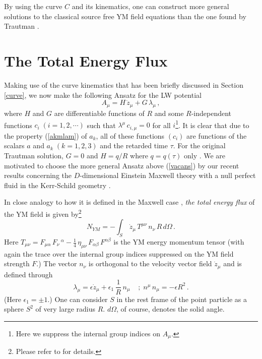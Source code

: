 \documentclass[a4paper,twocolumn,prd,showpacs,amsmath,amssymb]{revtex4}
\begin{document}
By using the curve $C$ and its kinematics, one can construct more general
solutions to the classical source free YM field equations than the one
found by Trautman \cite{traut}.

\section{\label{enflux} The Total Energy Flux}

Making use of the curve kinematics that has been briefly discussed in
Section \ref{curve}, we now make the following Ansatz for the LW potential
\begin{equation}
A_{\mu} = H \, \dot{z}_{\mu} + G \, \lambda_{\mu} \, , \label{vacans}
\end{equation}
where $H$ and $G$ are differentiable functions of $R$ and some $R$-independent
functions $c_i \; (i=1,2, \cdots)$ such that $\lambda^{\mu} \, c_{i,\mu} = 0$
for all $i$\footnote{Here we suppress the internal group indices on $A_{\mu}$.}. It
is clear that due to the property (\ref{akmlam}) of $a_k$, all of these
functions $(c_i)$ are functions of the scalars $a$ and $a_k \; (k=1,2,3)$
and the retarded time $\tau$. For the original Trautman solution, $G=0$
and $H=q/R$ where $q=q(\tau)$ only \cite{traut}. We are motivated to
choose the more general Ansatz above (\ref{vacans}) by our recent results
concerning the $D$-dimensional Einstein Maxwell theory with a null perfect
fluid in the Kerr-Schild geometry \cite{gs1}.

In close analogy to how it is defined in the Maxwell case
\cite{bar}, {\it the total energy flux} of the YM field is
given by\footnote{Please refer to \cite{gs1} for details.}
\begin{equation}
N_{YM} = - \int_{S} \, \dot{z}_{\mu} \, T^{\mu \nu} \, n_{\nu} \, R \, d\Omega \, .
\label{flux}
\end{equation}
Here $T_{\mu \nu} = F_{\mu \alpha}\, F_{\nu}\,^{\alpha} - \frac{1}{4} \,
\eta_{\mu \nu} \, F_{\alpha \beta} \, F^{\alpha \beta}$ is the YM energy
momentum tensor (with again the trace over the internal group indices
suppressed on the YM field strength $F$.) The vector $n_{\nu}$ is orthogonal
to the velocity vector field $\dot{z}_{\mu}$ and is defined through
\begin{equation}
\lambda_{\mu} = \epsilon \dot{z}_{\mu} + \epsilon_{1} \, \frac{1}{R} \, n_{\mu}
\;\;\;\; ; \; n^{\mu} \, n_{\mu} = - \epsilon R^2 \, . \label{lamzn}
\end{equation}
(Here $\epsilon_{1}= \pm 1$.) One can consider $S$ in the rest frame of the
point particle as a sphere $S^2$ of very large radius $R$. $d\Omega$, of course,
denotes the solid angle.
\end{document}
